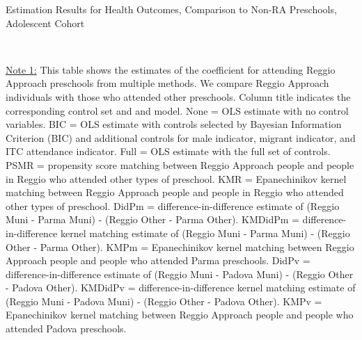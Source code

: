 \begin{table}[H] \caption{Estimation Results for Health Outcomes, Comparison to Non-RA Preschools,  Adolescent Cohort} \label{ols-H-adol-reg-reli}
\scalebox{0.6}{}
\vspace{1ex} \\
\footnotesize\raggedright{\underline{Note 1:} This table shows the estimates of the coefficient for attending Reggio Approach preschools from multiple methods. We compare Reggio Approach individuals with those who attended other preschools. Column title indicates the corresponding control set and and model. None = OLS estimate with no control variables. BIC = OLS estimate with controls selected by Bayesian Information Criterion (BIC) and additional controls for male indicator, migrant indicator, and ITC attendance indicator. Full = OLS estimate with the full set of controls. PSMR =  propensity score matching between Reggio Approach people and people in Reggio who attended other types of preschool. KMR = Epanechinikov kernel matching between Reggio Approach people and people in Reggio who attended other types of preschool. DidPm = difference-in-difference estimate of (Reggio Muni - Parma Muni) - (Reggio Other - Parma Other). KMDidPm = difference-in-difference kernel matching estimate of (Reggio Muni - Parma Muni) - (Reggio Other - Parma Other).   KMPm = Epanechinikov kernel matching between Reggio Approach people and people who attended Parma preschools. DidPv = difference-in-difference estimate of (Reggio Muni - Padova Muni) - (Reggio Other - Padova Other). KMDidPv = difference-in-difference kernel matching estimate of (Reggio Muni - Padova Muni) - (Reggio Other - Padova Other).  KMPv = Epanechinikov kernel matching between Reggio Approach people and people who attended Padova preschools.}
\end{table}


